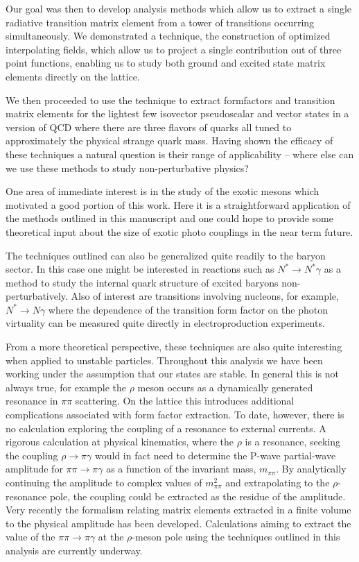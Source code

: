 Our goal was then to develop analysis methods which allow us to extract a single radiative transition matrix element from a tower of transitions occurring simultaneously. We demonstrated a technique, the construction of optimized interpolating fields, which allow us to project a single contribution out of three point functions, enabling us to study both ground and excited state matrix elements directly on the lattice.  

We then proceeded to use the technique to extract formfactors and transition matrix elements for the lightest few isovector pseudoscalar and vector states in a version of QCD where there are three flavors of quarks all tuned to approximately the physical strange quark mass. Having shown the efficacy of these techniques a natural question is their range of applicability -- where else can we use these methods to study non-perturbative physics?   

One area of immediate interest is in the study of the exotic mesons which motivated a good portion of this work. Here it is a straightforward application of the methods outlined in this manuscript and one could hope to provide some theoretical input about the size of exotic photo couplings in the near term future. 

The techniques outlined can also be generalized quite readily to the baryon sector. In this case one might be interested in reactions such as $N^* \rightarrow N^* \gamma$ as a method to study the internal quark structure of excited baryons non-perturbatively. Also of interest are transitions involving nucleons, for example, $N^*\rightarrow N \gamma$ where the dependence of the transition form factor on the photon virtuality can be measured quite directly in electroproduction experiments. 

From a more theoretical perspective, these techniques are also quite interesting when applied to unstable particles. Throughout this analysis we have been working under the assumption that our states are stable. In general this is not always true, for example the $\rho$ meson occurs as a dynamically generated resonance in $\pi\pi$ scattering. On the lattice this introduces additional complications associated with form factor extraction. To date, however, there is no calculation exploring the coupling of a resonance to external currents. A rigorous calculation at physical kinematics, where the $\rho$ is a resonance, seeking the coupling $\rho\rightarrow\pi\gamma$ would in fact need to determine the P-wave partial-wave amplitude for $\pi\pi \rightarrow \pi \gamma$ as a function of the invariant mass, $m_{\pi\pi}$. By analytically continuing the amplitude to complex values of $m^2_{\pi\pi}$ and extrapolating to the $\rho$-resonance pole, the coupling could be extracted as the residue of the amplitude. Very recently \cite{Briceno:2014uqa} the formalism relating matrix elements extracted in a finite volume to the physical amplitude has been developed. Calculations aiming to extract the value of the  $\pi\pi \rightarrow \pi \gamma$ at the $\rho$-meson pole using the techniques outlined in this analysis are currently underway.

